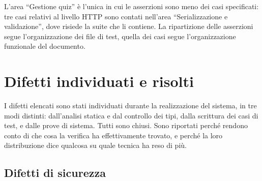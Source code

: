 \begin{nota}
L'area \enquote{Gestione quiz} è l'unica in cui le asserzioni sono meno dei
casi specificati: tre casi relativi al livello HTTP sono contati nell'area
\enquote{Serializzazione e validazione}, dove risiede la suite che li
contiene. La ripartizione delle asserzioni segue l'organizzazione dei file di
test, quella dei casi segue l'organizzazione funzionale del documento.
\end{nota}

\section{Difetti individuati e risolti}
\label{sec:td-difetti}

I difetti elencati sono stati individuati durante la realizzazione del
sistema, in tre modi distinti: dall'analisi statica e dal controllo dei tipi,
dalla scrittura dei casi di test, e dalle prove di sistema. Tutti sono
chiusi. Sono riportati perché rendono conto di che cosa la verifica ha
effettivamente trovato, e perché la loro distribuzione dice qualcosa su quale
tecnica ha reso di più.

\subsection{Difetti di sicurezza}

